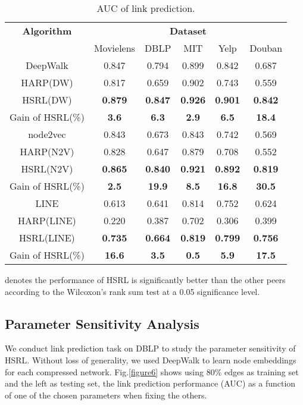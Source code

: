 \documentclass[conference]{IEEEtran}
\begin{document}
\begin{table}
    \caption{{\small AUC of link prediction.}}\label{table2}
    \begin{tabular}{cccccc}
        \toprule
         \textbf{Algorithm} & \multicolumn{5}{c}{\textbf{Dataset}} \\
          & Movielens & DBLP & MIT & Yelp & Douban \\
         \midrule
         DeepWalk & 0.847 & 0.794 & 0.899 & 0.842 & 0.687 \\
         HARP(DW) & 0.817 & 0.659 & 0.902 & 0.743 & 0.559 \\
         HSRL(DW) & \textbf{0.879} & \textbf{0.847} & \textbf{0.926} & \textbf{0.901} & \textbf{0.842} \\
         Gain of HSRL(\%) & \textbf{3.6} & \textbf{6.3} & \textbf{2.9} & \textbf{6.5} & \textbf{18.4} \\
         \midrule
         node2vec & 0.843 & 0.673 & 0.843 & 0.742 & 0.569 \\
         HARP(N2V) & 0.828 & 0.647 & 0.879 & 0.708 & 0.552 \\
         HSRL(N2V) & \textbf{0.865} & \textbf{0.840} & \textbf{0.921} & \textbf{0.892} & \textbf{0.819} \\
         Gain of HSRL(\%) & \textbf{2.5} & \textbf{19.9} & \textbf{8.5} & \textbf{16.8} & \textbf{30.5} \\
         \midrule
         LINE & 0.613 & 0.641 & 0.814 & 0.752 & 0.624 \\
         HARP(LINE) & 0.220 & 0.387 & 0.702 & 0.306 & 0.399 \\
         HSRL(LINE) & \textbf{0.735} & \textbf{0.664} & \textbf{0.819} & \textbf{0.799} & \textbf{0.756} \\
         Gain of HSRL(\%) & \textbf{16.6} & \textbf{3.5} & \textbf{0.5} & \textbf{5.9} & \textbf{17.5} \\
         \bottomrule
    \end{tabular}
	\smallskip
	
	{\small  denotes the performance of HSRL is significantly better than the other peers according to the Wilcoxon’s rank sum test at a 0.05 significance level.}
\end{table}

\subsection{Parameter Sensitivity Analysis}
We conduct link prediction task on DBLP to study the parameter sensitivity of HSRL. Without loss of generality, we used DeepWalk to learn node embeddings for each compressed network. Fig.\ref{figure6} shows using 80\% edges as training set and the left as testing set, the link prediction performance (AUC) as a function of one of the chosen parameters when fixing the others.
\end{document}
